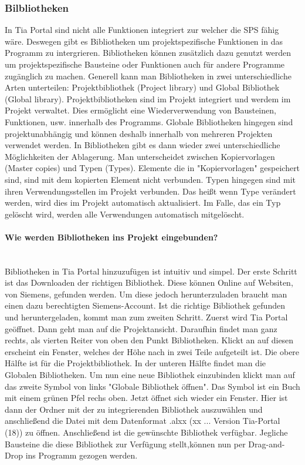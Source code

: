     \subsubsection{Bilbliotheken } \mbox{}
    In Tia Portal sind nicht alle Funktionen integriert zur welcher die SPS fähig wäre. Deswegen gibt es Bibliotheken um projektspezifische Funktionen in das Programm zu intergrieren. Bibliotheken können zusätzlich dazu genutzt werden um projektspezifische Bausteine oder Funktionen auch für andere Programme zugänglich zu machen. Generell kann man Bibliotheken in zwei unterschiedliche Arten unterteilen: Projektbibliothek (Project library) und Global Bibliothek (Global library). Projektbibliotheken sind im Projekt integriert und werdem im Projekt verwaltet. Dies ermöglicht eine Wiederverwendung von Bausteinen, Funktionen, usw. innerhalb des Programms. Globale Bibliotheken hingegen sind projektunabhängig und können deshalb innerhalb von mehreren Projekten verwendet werden. In Bibliotheken gibt es dann wieder zwei unterschiedliche Möglichkeiten der Ablagerung. Man unterscheidet zwischen Kopiervorlagen (Master copies) und Typen (Types). Elemente die in "Kopiervorlagen" gespeichert sind, sind mit dem kopierten Element nicht verbunden. Typen hingegen sind mit ihren Verwendungsstellen im Projekt verbunden. Das heißt wenn Type verändert werden, wird dies im Projekt automatisch aktualisiert. Im Falle, das ein Typ gelöscht wird, werden alle Verwendungen automatisch mitgelöscht.  
    \cite{Programmierleitfaden_für_S7-1500}


        \paragraph{Wie werden Bibliotheken ins Projekt eingebunden?} \mbox{} \\
        \label{Bilbliotheken}
        Bibliotheken in Tia Portal hinzuzufügen ist intuitiv und simpel. Der erste Schritt ist das Downloaden der richtigen Bibliothek. Diese können Online auf Websiten, von Siemens, gefunden werden. Um diese jedoch herunterzuladen braucht man einen dazu berechtigten Siemens-Account. Ist die richtige Bibliothek gefunden und heruntergeladen, kommt man zum zweiten Schritt. Zuerst wird Tia Portal geöffnet. Dann geht man auf die Projektansicht. Daraufhin findet man ganz rechts, als vierten Reiter von oben den Punkt Bibliotheken. Klickt an auf diesen erscheint ein Fenster, welches der Höhe nach in zwei Teile aufgeteilt ist. Die obere Hälfte ist für die Projektbibliothek. In der unteren Hälfte findet man die Globalen Bibliotheken. Um nun eine neue Bibliothek einzubinden klickt man auf das zweite Symbol von links "Globale Bibliothek öffnen". Das Symbol ist ein Buch mit einem grünen Pfel rechs oben. Jetzt öffnet sich wieder ein Fenster. Hier ist dann der Ordner mit der zu integrierenden Bibliothek auszuwählen und anschließend die Datei mit dem Datenformat .alxx (xx ... Version Tia-Portal (18)) zu öffnen. Anschließend ist die gewünschte Bibliothek verfügbar. Jegliche Bausteine die diese Bibliothek zur Verfügung stellt,können nun per Drag-and-Drop ins Programm gezogen werden.
        \cite{Bibliotheken}


